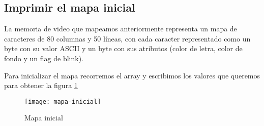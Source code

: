 \subsection{Imprimir el mapa inicial}

La memoria de video que mapeamos anteriormente representa un mapa de caracteres de 80 columnas y 50 líneas, con cada caracter representado como un byte con su valor ASCII y un byte con sus atributos (color de letra, color de fondo y un flag de blink).

Para inicializar el mapa recorremos el array y escribimos los valores que queremos para obtener la figura \ref{fig:mapa-inicial}

\begin{figure}[H]
    \centering
    \texttt{[image: mapa-inicial]}
    \caption{Mapa inicial}
    \label{fig:mapa-inicial}
\end{figure}

